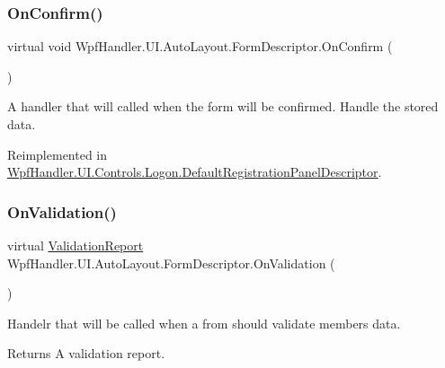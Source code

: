 \subsubsection{\texorpdfstring{On\+Confirm()}{OnConfirm()}}
{\footnotesize\ttfamily virtual void Wpf\+Handler.\+U\+I.\+Auto\+Layout.\+Form\+Descriptor.\+On\+Confirm (\begin{DoxyParamCaption}{ }\end{DoxyParamCaption})\hspace{0.3cm}{\ttfamily [virtual]}}



A handler that will called when the form will be confirmed. Handle the stored data. 



Reimplemented in \mbox{\hyperlink{class_wpf_handler_1_1_u_i_1_1_controls_1_1_logon_1_1_default_registration_panel_descriptor_aee1e6b6ba9214aac4a82b0213e4d3442}{Wpf\+Handler.\+U\+I.\+Controls.\+Logon.\+Default\+Registration\+Panel\+Descriptor}}.

\mbox{\label{class_wpf_handler_1_1_u_i_1_1_auto_layout_1_1_form_descriptor_a63527cbe3f75e544b7f4ab417bfbb555}} 
\subsubsection{\texorpdfstring{On\+Validation()}{OnValidation()}}
{\footnotesize\ttfamily virtual \mbox{\hyperlink{struct_wpf_handler_1_1_u_i_1_1_auto_layout_1_1_form_descriptor_1_1_validation_report}{Validation\+Report}} Wpf\+Handler.\+U\+I.\+Auto\+Layout.\+Form\+Descriptor.\+On\+Validation (\begin{DoxyParamCaption}{ }\end{DoxyParamCaption})\hspace{0.3cm}{\ttfamily [virtual]}}



Handelr that will be called when a from should validate members data. 

\begin{DoxyReturn}{Returns}
A validation report. 
\end{DoxyReturn}


